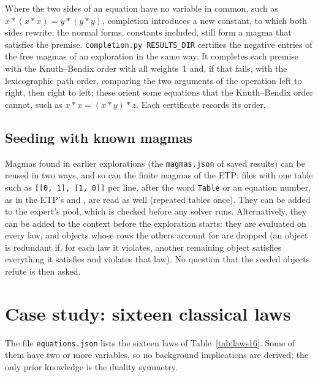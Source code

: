 \documentclass[11pt,a4paper]{article}
\theoremstyle{definition}
\theoremstyle{remark}
\newcommand{\code}[1]{\texttt{#1}}
\begin{document}
Where the two sides of an equation have no variable in common, such as $x * (x * x) = y * (y * y)$, completion introduces a new constant, to which both sides rewrite; the normal forms, constants included, still form a magma that satisfies the premise. \code{completion.py RESULTS\_DIR} certifies the negative entries of the free magmas of an exploration in the same way. It completes each premise with the Knuth--Bendix order with all weights~1 and, if that fails, with the lexicographic path order, comparing the two arguments of the operation left to right, then right to left; these orient some equations that the Knuth--Bendix order cannot, such as $x * x = (x * y) * z$. Each certificate records its order.

\subsection{Seeding with known magmas}\label{sec:seeding}

Magmas found in earlier explorations (the \code{magmas.json} of saved results) can be reused in two ways, and so can the finite magmas of the ETP: files with one table such as \code{[[0, 1], [1, 0]]} per line, after the word \code{Table} or an equation number, as in the ETP's  and , are read as well (repeated tables once). They can be added to the expert's pool, which is checked before any solver runs. Alternatively, they can be added to the context before the exploration starts: they are evaluated on every law, and objects whose rows the others account for are dropped (an object is redundant if, for each law it violates, another remaining object satisfies everything it satisfies and violates that law). No question that the seeded objects refute is then asked.

\section{Case study: sixteen classical laws}\label{sec:case16}

The file \code{equations.json} lists the sixteen laws of Table~\ref{tab:laws16}. Some of them have two or more variables, so no background implications are derived; the only prior knowledge is the duality symmetry.
\end{document}
